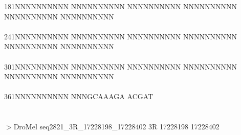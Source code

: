\documentclass[11pt,twoside,reqno,a4paper]{article}
\begin{document}
{181\hspace*{1\charwidth}NNNNNNNNNN	NNNNNNNNNN	NNNNNNNNNN	NNNNNNNNNN	NNNNNNNNNN	NNNNNNNNNN	\\
\hspace*{4\charwidth}\hspace*{1\charwidth}\hspace*{1\charwidth}\hspace*{1\charwidth}\hspace*{1\charwidth}\hspace*{1\charwidth}\hspace*{1\charwidth}\\
241\hspace*{1\charwidth}NNNNNNNNNN	NNNNNNNNNN	NNNNNNNNNN	NNNNNNNNNN	NNNNNNNNNN	NNNNNNNNNN	\\
\hspace*{4\charwidth}\hspace*{1\charwidth}\hspace*{1\charwidth}\hspace*{1\charwidth}\hspace*{1\charwidth}\hspace*{1\charwidth}\hspace*{1\charwidth}\\
301\hspace*{1\charwidth}NNNNNNNNNN	NNNNNNNNNN	NNNNNNNNNN	NNNNNNNNNN	NNNNNNNNNN	NNNNNNNNNN	\\
\hspace*{4\charwidth}\hspace*{1\charwidth}\hspace*{1\charwidth}\hspace*{1\charwidth}\hspace*{1\charwidth}\hspace*{1\charwidth}\hspace*{1\charwidth}\\
361\hspace*{1\charwidth}NNNNNNNNNN	NNNGCAAAGA	ACGAT\\
\hspace*{4\charwidth}\hspace*{1\charwidth}\hspace*{1\charwidth}\\
}
\\
$>$DroMel	seq2821\_3R\_17228198\_17228402	3R	17228198	17228402 \\
 \\
\end{document}
